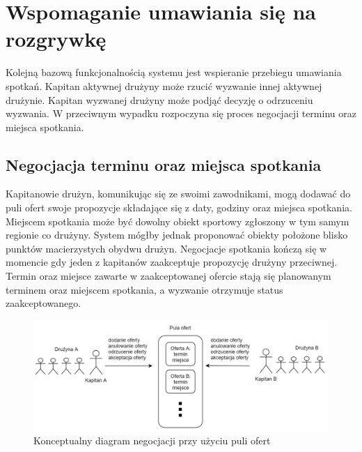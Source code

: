 \section{Wspomaganie umawiania się na rozgrywkę}

Kolejną bazową funkcjonalnością systemu jest wspieranie przebiegu umawiania spotkań. Kapitan aktywnej drużyny może rzucić wyzwanie innej aktywnej drużynie. Kapitan wyzwanej drużyny może podjąć decyzję o odrzuceniu wyzwania. W przeciwnym wypadku rozpoczyna się proces negocjacji terminu oraz miejsca spotkania. 

\subsection{Negocjacja terminu oraz miejsca spotkania}

Kapitanowie drużyn, komunikując się ze swoimi zawodnikami, mogą dodawać do puli ofert swoje propozycje składające się z daty, godziny oraz miejsca spotkania. Miejscem spotkania może być dowolny obiekt sportowy zgłoszony w tym samym regionie co drużyny. System mógłby jednak proponować obiekty położone blisko punktów macierzystych obydwu drużyn. Negocjacje spotkania kończą się w momencie gdy jeden z kapitanów zaakceptuje propozycję drużyny przeciwnej. Termin oraz miejsce zawarte w zaakceptowanej ofercie stają się planowanym terminem oraz miejscem spotkania, a wyzwanie otrzymuje status zaakceptowanego.

\begin{figure}[ht]
\centering
\includegraphics[width=\linewidth]{03-koncept/rys/offer-pool.PNG}
\caption{Konceptualny diagram negocjacji przy użyciu puli ofert}
\label{fig:diagram-alg-ext}
\end{figure}

